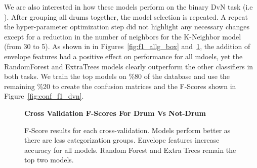 \documentclass[\main/thesis.tex]{subfiles}
\begin{document}
We are also interested in how these models perform on the binary DvN task (i.e \decfirst).
After grouping all drums together, the model selection is repeated. A repeat the hyper-parameter optimization step did not highlight any necessary changes except for a reduction in the number of neighbors for the K-Neighbor model (from 30 to 5). As shown in in Figures~\ref{fig:f1_allg_box} and~\ref{fig:f1_dvn_box}, the addition of envelope features had a positive effect on performance for all mdoels, yet the RandomForest and ExtraTrees models clearly outperform the other classifiers in both tasks. We train the top models on \%80 of the database and use the remaining \%20 to create the confusion matrices and the F-Scores shown in Figure~\ref{fig:conf_f1_dvn}.
\begin{figure}[htbp]   
    \begin{center}
        \textbf{Cross Validation F-Scores For Drum Vs Not-Drum}
    \caption{F-Score results for each cross-validation. Models perform better as there are less categorization groups. Envelope features increase accuracy for all models. Random Forest and Extra Trees remain the top two models. }
    \label{fig:f1_dvn_box}
    \end{center}
\end{figure}
\end{document}
